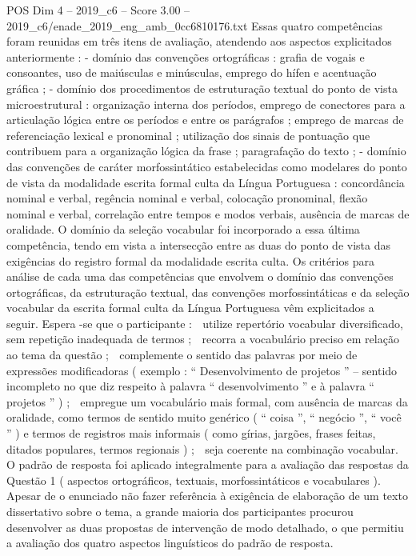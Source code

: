 \begin{textsample}{POS Dim 4 – 2019\_c6 – Score 3.00 – 2019\_c6/enade\_2019\_eng\_amb\_0cc6810176.txt}
Essas quatro competências foram reunidas em três itens de avaliação, atendendo aos aspectos explicitados anteriormente : - domínio das convenções ortográficas : grafia de vogais e consoantes, uso de maiúsculas e minúsculas, emprego do hífen e acentuação gráfica ; - domínio dos procedimentos de estruturação textual do ponto de vista microestrutural : organização interna dos períodos, emprego de conectores para a articulação lógica entre os períodos e entre os parágrafos ; emprego de marcas de referenciação lexical e pronominal ; utilização dos sinais de pontuação que contribuem para a organização lógica da frase ; paragrafação do texto ; - domínio das convenções de caráter morfossintático estabelecidas como modelares do ponto de vista da modalidade escrita formal culta da Língua Portuguesa : concordância nominal e verbal, regência nominal e verbal, colocação pronominal, flexão nominal e verbal, correlação entre tempos e modos verbais, ausência de marcas de oralidade.
O domínio da seleção vocabular foi incorporado a essa última competência, tendo em vista a intersecção entre as duas do ponto de vista das exigências do registro formal da modalidade escrita culta.
Os critérios para análise de cada uma das competências que envolvem o domínio das convenções ortográficas, da estruturação textual, das convenções morfossintáticas e da seleção vocabular da escrita formal culta da Língua Portuguesa vêm explicitados a seguir.
Espera -se que o participante :  utilize repertório vocabular diversificado, sem repetição inadequada de termos ;  recorra a vocabulário preciso em relação ao tema da questão ;  complemente o sentido das palavras por meio de expressões modificadoras ( exemplo : “ Desenvolvimento de projetos ” – sentido incompleto no que diz respeito à palavra “ desenvolvimento ” e à palavra “ projetos ” ) ;  empregue um vocabulário mais formal, com ausência de marcas da oralidade, como termos de sentido muito genérico ( “ coisa ”, “ negócio ”, “ você ” ) e termos de registros mais informais ( como gírias, jargões, frases feitas, ditados populares, termos regionais ) ;  seja coerente na combinação vocabular.
O padrão de resposta foi aplicado integralmente para a avaliação das respostas da Questão 1 ( aspectos ortográficos, textuais, morfossintáticos e vocabulares ).
Apesar de o enunciado não fazer referência à exigência de elaboração de um texto dissertativo sobre o tema, a grande maioria dos participantes procurou desenvolver as duas propostas de intervenção de modo detalhado, o que permitiu a avaliação dos quatro aspectos linguísticos do padrão de resposta.

\end{textsample}
